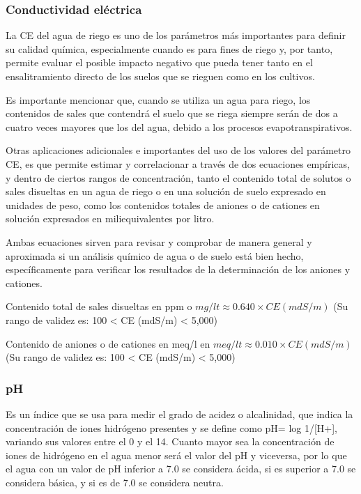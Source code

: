 \subsubsection{Conductividad eléctrica}
La CE del agua de riego es uno de los parámetros más importantes para definir su calidad química, especialmente cuando es para fines de riego y, por tanto, permite evaluar el posible impacto negativo que pueda tener tanto en el ensalitramiento directo de los suelos que se rieguen como en los cultivos.

Es importante mencionar que, cuando se utiliza un agua para riego, los contenidos de sales que contendrá el suelo que se riega siempre serán de dos a cuatro veces mayores que los del agua, debido a los procesos evapotranspirativos. 

Otras aplicaciones adicionales e importantes del uso de los valores del parámetro CE, es que permite estimar y correlacionar a través de dos ecuaciones empíricas, y dentro de ciertos rangos de concentración, tanto el contenido total de solutos o sales disueltas en un agua de riego o en una solución de suelo expresado en unidades de peso, como los contenidos totales de aniones o de cationes en solución expresados en miliequivalentes por litro.

Ambas ecuaciones sirven para revisar y comprobar de manera general y aproximada si un análisis químico de agua o de suelo está bien hecho, específicamente para verificar los resultados de la determinación de los aniones y cationes.

Contenido total de sales disueltas en ppm o $mg/lt \approx 0.640 \times CE (mdS/m)$
(Su rango de validez es: 100 < CE (mdS/m) < 5,000)


Contenido de aniones o de cationes en meq/l en $meq/lt \approx 0.010 \times CE (mdS/m)$
(Su rango de validez es: 100 < CE (mdS/m) < 5,000)

\subsubsection{pH}
Es un índice que se usa para medir el grado de acidez o alcalinidad, que indica la concentración de iones hidrógeno presentes y se define como pH= log 1/[H+], variando sus valores entre el 0 y el 14. Cuanto mayor sea la concentración de iones de hidrógeno en el agua menor será el valor del pH y viceversa, por lo que el agua con un valor de pH inferior a 7.0 se considera ácida, si es superior a 7.0 se considera básica, y si es de 7.0 se considera neutra.

